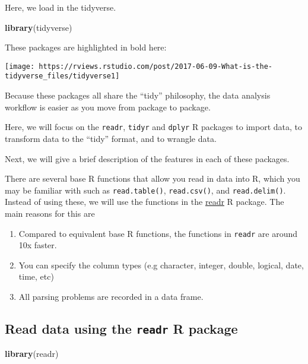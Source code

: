 \documentclass[]{article}
\newenvironment{Shaded}{\begin{snugshade}}{\end{snugshade}}
\newcommand{\KeywordTok}[1]{\textcolor[rgb]{0.13,0.29,0.53}{\textbf{#1}}}
\newcommand{\NormalTok}[1]{#1}
\providecommand{\tightlist}{%
  \setlength{\itemsep}{0pt}\setlength{\parskip}{0pt}}
\begin{document}
Here, we load in the tidyverse.

\begin{Shaded}
\begin{Highlighting}[]
\KeywordTok{library}\NormalTok{(tidyverse)}
\end{Highlighting}
\end{Shaded}

These packages are highlighted in bold here:

\texttt{[image: https://rviews.rstudio.com/post/2017-06-09-What-is-the-tidyverse\_files/tidyverse1]}

Because these packages all share the ``tidy'' philosophy, the data
analysis workflow is easier as you move from package to package.

Here, we will focus on the \texttt{readr}, \texttt{tidyr} and
\texttt{dplyr} R packages to import data, to transform data to the
``tidy'' format, and to wrangle data.

Next, we will give a brief description of the features in each of these
packages.

There are several base R functions that allow you read in data into R,
which you may be familiar with such as \texttt{read.table()},
\texttt{read.csv()}, and \texttt{read.delim()}. Instead of using these,
we will use the functions in the
\href{https://readr.tidyverse.org/articles/readr.html}{readr} R package.
The main reasons for this are

\begin{enumerate}
\def\labelenumi{\arabic{enumi}.}
\tightlist
\item
  Compared to equivalent base R functions, the functions in
  \texttt{readr} are around 10x faster.
\item
  You can specify the column types (e.g character, integer, double,
  logical, date, time, etc)
\item
  All parsing problems are recorded in a data frame.
\end{enumerate}

\hypertarget{read-data-using-the-readr-r-package}{%
\subsection{\texorpdfstring{Read data using the \texttt{readr} R
package}{Read data using the readr R package}}\label{read-data-using-the-readr-r-package}}

\begin{Shaded}
\begin{Highlighting}[]
\KeywordTok{library}\NormalTok{(readr)}
\end{Highlighting}
\end{Shaded}
\end{document}
